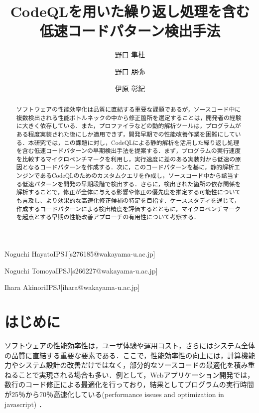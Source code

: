 \documentclass[submit,techrep,noauthor]{ipsj}
\begin{document}
\title{CodeQLを用いた繰り返し処理を含む
\\
低速コードパターン検出手法
}


\author{野口 隼杜}{Noguchi Hayato}{IPSJ}[s276185@wakayama-u.ac.jp]
\author{野口 朋弥}{Noguchi Tomoya}{IPSJ}[s266227@wakayama-u.ac.jp]
\author{伊原 彰紀}{Ihara Akinori}{IPSJ}[ihara@wakayama-u.ac.jp]

\begin{abstract}
ソフトウェアの性能効率化は品質に直結する重要な課題であるが，ソースコード中に複数検出される性能ボトルネックの中から修正箇所を選定することは，開発者の経験に大きく依存している．また，プロファイラなどの動的解析ツールは，プログラムがある程度実装された後にしか適用できず，開発早期での性能改善作業を困難にしている．本研究では，この課題に対し，CodeQLによる静的解析を活用した繰り返し処理を含む低速コードパターンの早期検出手法を提案する．まず，プログラムの実行速度を比較するマイクロベンチマークを利用し，実行速度に差のある実装対から低速の原因となるコードパターンを作成する．次に，このコードパターンを基に，静的解析エンジンであるCodeQLのためのカスタムクエリを作成し，ソースコード中から該当する低速パターンを開発の早期段階で検出する．さらに，検出された箇所の依存関係を解析することで，修正が全体に与える影響や修正の優先度を推定する可能性についても言及し、より効果的な高速化修正候補の特定を目指す．ケーススタディを通じて，作成するコードパターンによる検出精度を評価するとともに，マイクロベンチマークを起点とする早期の性能改善アプローチの有用性について考察する．
\end{abstract}


\maketitle

\section{はじめに}

 ソフトウェアの性能効率性は，ユーザ体験や運用コスト，さらにはシステム全体の品質に直結する重要な要素である．ここで，性能効率性の向上には，計算機能力やシステム設計の改善だけではなく，部分的なソースコードの最適化を積み重ねることで実現される場合も多い．例として，Webアプリケーション開発では，数行のコード修正による最適化を行っており，結果としてプログラムの実行時間が25％から70％高速化している(performance issues and optimization in javascript) ．
\end{document}
